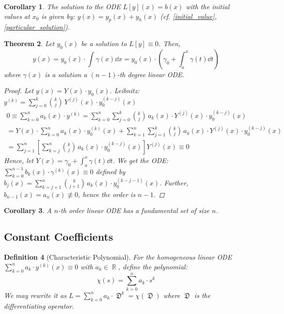 \documentclass[12pt]{article}
\DeclareMathOperator{\R}{\mathbb{R}}
\DeclareMathOperator{\D}{\mathfrak{D}}
\newcommand{\der}[2][n]{{#2}^{(#1)}}
\newtheorem{theorem}{Theorem}[subsection]
\newtheorem{definition}[theorem]{Definition}
\newtheorem{corollary}[theorem]{Corollary}
\begin{document}
\begin{corollary}
  The solution to the ODE $L[y](x)=b(x)$ with the initial values at $x_0$ is given by: $y(x)=y_p(x)+y_h(x)$ (cf. \ref{initial_value},\ref{particular_solution}).
\end{corollary}

\begin{theorem}
  Let $y_0(x)$ be a solution to $L[y]\equiv 0$. Then, $$y(x)=y_0(x)\cdot\int \gamma(x)\dd{x}=y_0(x)\cdot\left(\gamma_0+\int_a^x \gamma(t)\dd{t}\right)$$ where $\gamma(x)$ is a solution a $(n-1)$-th degree linear ODE.
  \begin{proof}
    Let $y(x)=Y(x)\cdot y_0(x)$. Leibnitz: $\der[k]{y}=\sum_{j=0}^k\binom{k}{j}\,\der[j]{Y}(x)\cdot \der[k-j]{y}_0(x)$ 
    \begin{align*}
      0\equiv\sum_{k=0}^n a_k(x)\cdot\der[k]{y}=\sum_{k=0}^n \sum_{j=0}^k\binom{k}{j}\,a_k(x)\cdot\der[j]{Y}(x)\cdot \der[k-j]{y}_0(x)\\
      =Y(x)\cdot \sum_{k=0}^n a_k(x)\cdot \der[k]{y}_0(x)+\sum_{k=1}^n \sum_{j=1}^k\binom{k}{j}\,a_k(x)\cdot\der[j]{Y}(x)\cdot \der[k-j]{y}_0(x)\\
      =\sum_{j=1}^n \left[\sum_{k=j}^n\binom{k}{j}\,a_k(x)\cdot\der[k-j]{y}_0(x)\right]\der[j]{Y}(x)\equiv 0
    \end{align*}
    Hence, let $\displaystyle Y(x)=\gamma_0+\int_a^x \gamma(t)\dd{t}$. We get the ODE: $\displaystyle\sum_{k=0}^{n-1}b_k(x)\cdot\der[k]{\gamma}(x)\equiv 0$ defined by $\displaystyle b_j(x)=\sum_{k=j+1}^n\binom{k}{j+1}\,a_k(x)\cdot\der[k-j-1]{y}_0(x)$. Further, $b_{n-1}(x)=a_n(x)\not\equiv 0$, hence the order is $n-1$.
  \end{proof}
\end{theorem}

\begin{corollary}
  A $n$-th order linear ODE has a fundamental set of size $n$.
\end{corollary}

\pagebreak

\subsection{Constant Coefficients}

\begin{definition}[Characteristic Polynomial]
  For the homogeneous linear ODE $\sum_{k=0}^n a_k\cdot\der[k]{y}(x)\equiv 0$ with $a_k\in\R$, define the polynomial: $$\chi(s)=\sum_{k=0}^n a_k\cdot s^k$$ We may rewrite it as $L=\sum_{k=0}^n a_k\cdot \D^k=\chi(\D)$ where $\D$ is the differentiating operator.
\end{definition}
\end{document}
